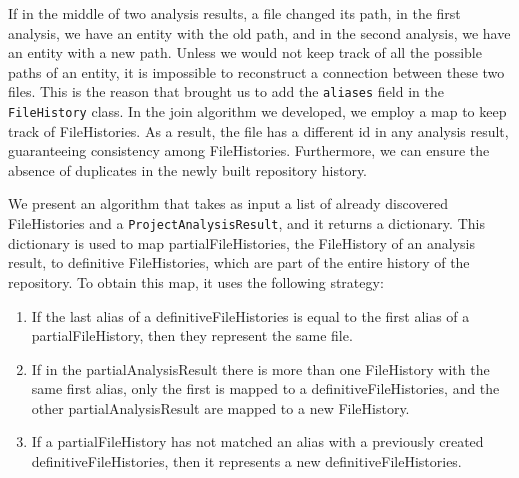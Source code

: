If in the middle of two analysis results, a file changed its path, in the first analysis, we have an entity with the old path, 
and in the second analysis, we have an entity with a new path. 
Unless we would not keep track of all the possible paths of an entity, it is impossible to reconstruct a connection between these two files. 
This is the reason that brought us to add the \texttt{aliases} field in the \texttt{FileHistory} class. 
In the join algorithm we developed, we employ a map to keep track of FileHistories.
As a result, the file has a different id in any analysis result, guaranteeing consistency among FileHistories. Furthermore, we can ensure the absence of duplicates in the newly built repository history. 

We present an algorithm that takes as input a list of already discovered FileHistories and a \texttt{ProjectAnalysisResult}, and it returns a dictionary.
This dictionary is used to map partialFileHistories, the FileHistory of an analysis result, to definitive FileHistories, which are part of the entire history of the repository. 
To obtain this map, it uses the following strategy:
\begin{enumerate}
    \item If the last alias of a definitiveFileHistories is equal to the first alias of a partialFileHistory, then they represent the same file.
    \item If in the partialAnalysisResult there is more than one FileHistory with the same first alias, only the first is mapped to a definitiveFileHistories, and the other partialAnalysisResult are mapped to a new FileHistory.
    \item If a partialFileHistory has not matched an alias with a previously created definitiveFileHistories, then it represents a new definitiveFileHistories.
\end{enumerate}

        

